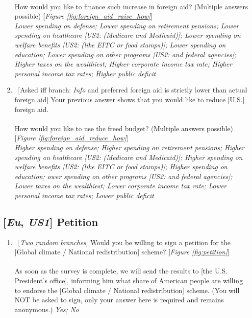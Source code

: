 \documentclass[12pt,english]{article}
\begin{document}
\begin{enumerate}[resume]
\\
  How would you like to finance such increase in foreign aid? (Multiple answers possible) [\textit{Figure \ref{fig:foreign_aid_raise_how}}]
  \\ \textit{Lower spending on defense; Lower spending on retirement pensions; Lower spending on healthcare [\textit{US2}: (Medicare and Medicaid)]; Lower spending on welfare benefits [\textit{US2}: (like EITC or food stamps)]; Lower spending on education; Lower spending on other programs [\textit{US2}: and federal agencies]; Higher taxes on the wealthiest; Higher corporate income tax rate; Higher personal income tax rates; Higher public deficit}
  \item \label{q:foreign_aid_reduce_how} ~[Asked iff branch: \textit{Info} and preferred foreign aid is strictly lower than actual foreign aid] Your previous answer shows that you would like to reduce [U.S.] foreign aid.\\
\\
  How would you like to use the freed budget? (Multiple answers possible) [\textit{Figure \ref{fig:foreign_aid_reduce_how}}]
  \\ \textit{Higher spending on defense; Higher spending on retirement pensions; Higher spending on healthcare [\textit{US2}: (Medicare and Medicaid)]; Higher spending on welfare benefits [\textit{US2}: (like EITC or food stamps)]; Higher spending on education; ower spending on other programs [\textit{US2}: and federal agencies]; Lower taxes on the wealthiest; Lower corporate income tax rate; Lower personal income tax rates; Lower public deficit}
\end{enumerate}

\subsection*{[\textit{Eu}, \textit{US1}] Petition}
\begin{enumerate}[resume] \item ~[\textit{Two random branches}] \label{q:petition} Would you be willing to sign a petition for the [Global climate / National redistribution] scheme?  [\textit{Figure \ref{fig:petition}}]\\
\\
As soon as the survey is complete, we will send the results to [the U.S. President's office], informing him what share of American people are willing to endorse the [Global climate / National redistribution] scheme. (You will NOT be asked to sign, only your answer here is required and remains anonymous.) 
\textit{Yes; No}
\end{enumerate}
\end{document}
